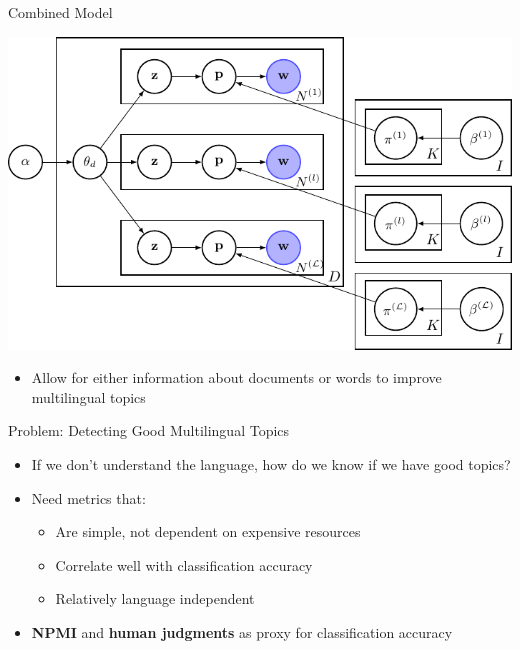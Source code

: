 \documentclass[compress]{beamer}
\begin{document}
	\begin{frame}{Combined Model}
		\begin{center}
			\includegraphics[height=0.4\textheight]{multilingual_itm/link-prior.pdf}
		\end{center}
		\begin{itemize}
			\item Allow for either information about
                          documents or words to improve multilingual topics
		\end{itemize}
	\end{frame}


\begin{frame}{Problem: Detecting Good Multilingual Topics}

\begin{itemize}
  \item If we don't understand the language, how do we know if we have
    good topics?
  \item Need metrics that:
  \begin{itemize}
    \item Are simple, not dependent on expensive resources
    \item Correlate well with classification accuracy
    \item Relatively language independent
   \end{itemize}
\pause
\item {\bf NPMI} and {\bf human judgments} as proxy for classification accuracy
\end{itemize}
\end{frame}
\end{document}
